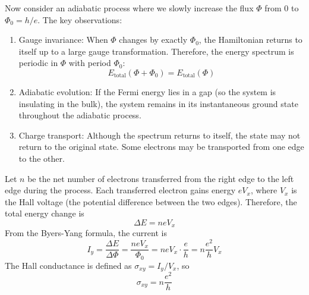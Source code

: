 \documentclass[12pt,a4paper]{article}
\begin{document}
    Now consider an adiabatic process where we slowly increase the flux $\Phi$ from $0$ to $\Phi_0 = h/e$. The key observations:
    \begin{enumerate}
        \item Gauge invariance: When $\Phi$ changes by exactly $\Phi_0$, the Hamiltonian returns to itself up to a large gauge transformation. Therefore, the energy spectrum is periodic in $\Phi$ with period $\Phi_0$:
        \[ E_{\text{total}}(\Phi + \Phi_0) = E_{\text{total}}(\Phi) \]

        \item Adiabatic evolution: If the Fermi energy lies in a gap (so the system is insulating in the bulk), the system remains in its instantaneous ground state throughout the adiabatic process.

        \item Charge transport: Although the spectrum returns to itself, the state may not return to the original state. Some electrons may be transported from one edge to the other.
    \end{enumerate}
    Let $n$ be the net number of electrons transferred from the right edge to the left edge during the process. Each transferred electron gains energy $eV_x$, where $V_x$ is the Hall voltage (the potential difference between the two edges). Therefore, the total energy change is
    \[
        \Delta E = n e V_x
    \]
    From the Byers-Yang formula, the current is
    \[
        I_y = \frac{\Delta E}{\Delta \Phi}
        = \frac{n e V_x}{\Phi_0}
        = n e V_x \cdot \frac{e}{h}
        = n \frac{e^2}{h} V_x
    \]
    The Hall conductance is defined as $\sigma_{xy} = I_y / V_x$, so
    \begin{equation}
        \sigma_{xy} = n \frac{e^2}{h}
    \end{equation}
\end{document}
